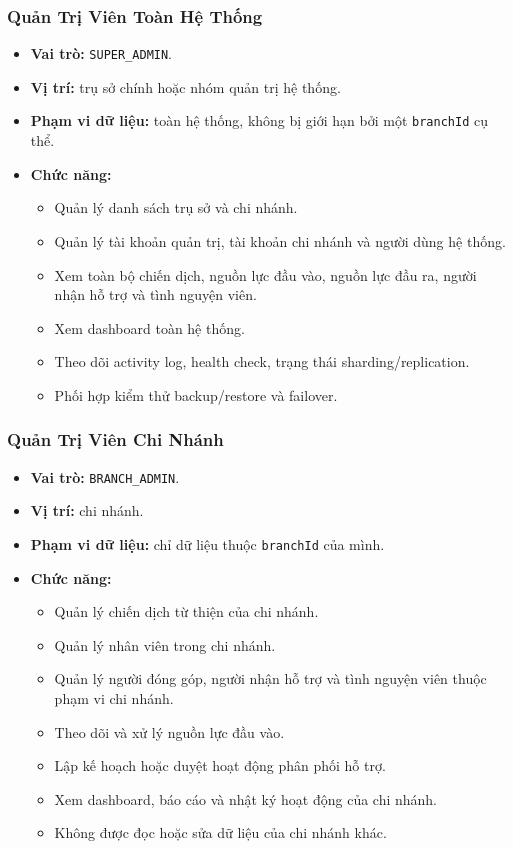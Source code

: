 \documentclass[12pt,a4paper]{article}
\begin{document}
\subsubsection{Quản Trị Viên Toàn Hệ Thống}
\begin{itemize}
\item \textbf{Vai trò:} \texttt{SUPER\_ADMIN}.
\item \textbf{Vị trí:} trụ sở chính hoặc nhóm quản trị hệ thống.
\item \textbf{Phạm vi dữ liệu:} toàn hệ thống, không bị giới hạn bởi một \texttt{branchId} cụ thể.
\item \textbf{Chức năng:}
\begin{itemize}
\item Quản lý danh sách trụ sở và chi nhánh.
\item Quản lý tài khoản quản trị, tài khoản chi nhánh và người dùng hệ thống.
\item Xem toàn bộ chiến dịch, nguồn lực đầu vào, nguồn lực đầu ra, người nhận hỗ trợ và tình nguyện viên.
\item Xem dashboard toàn hệ thống.
\item Theo dõi activity log, health check, trạng thái sharding/replication.
\item Phối hợp kiểm thử backup/restore và failover.
\end{itemize}
\end{itemize}
\subsubsection{Quản Trị Viên Chi Nhánh}
\begin{itemize}
\item \textbf{Vai trò:} \texttt{BRANCH\_ADMIN}.
\item \textbf{Vị trí:} chi nhánh.
\item \textbf{Phạm vi dữ liệu:} chỉ dữ liệu thuộc \texttt{branchId} của mình.
\item \textbf{Chức năng:}
\begin{itemize}
\item Quản lý chiến dịch từ thiện của chi nhánh.
\item Quản lý nhân viên trong chi nhánh.
\item Quản lý người đóng góp, người nhận hỗ trợ và tình nguyện viên thuộc phạm vi chi nhánh.
\item Theo dõi và xử lý nguồn lực đầu vào.
\item Lập kế hoạch hoặc duyệt hoạt động phân phối hỗ trợ.
\item Xem dashboard, báo cáo và nhật ký hoạt động của chi nhánh.
\item Không được đọc hoặc sửa dữ liệu của chi nhánh khác.
\end{itemize}
\end{itemize}
\end{document}
